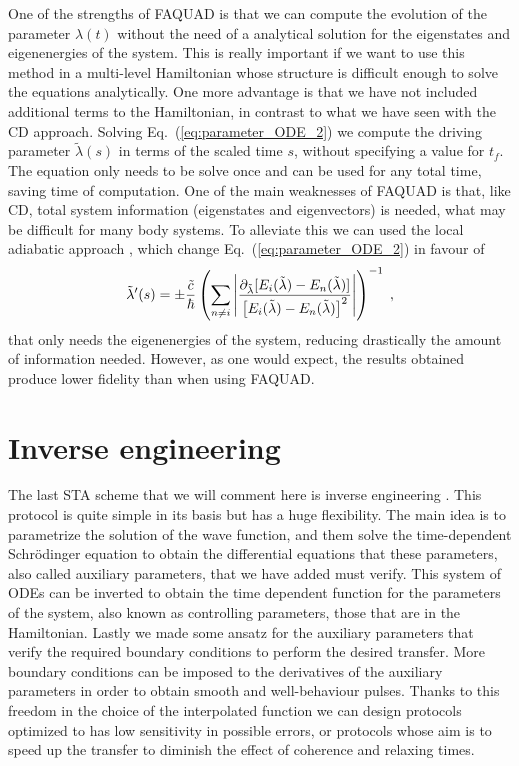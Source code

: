 One of the strengths of FAQUAD is that we can compute the evolution of the parameter $\lambda(t)$ without the need of a analytical solution for the eigenstates and eigenenergies of the system. This is really important if we want to use this method in a multi-level Hamiltonian whose structure is difficult enough to solve the equations analytically. One more advantage is that we have not included additional terms to the Hamiltonian, in contrast to what we have seen with the CD approach. Solving Eq.~(\ref{eq:parameter_ODE_2}) we compute the driving parameter $\tilde{\lambda}(s)$ in terms of the scaled time $s$, without specifying a value for $t_f$. The equation only needs to be solve once and can be used for any total time, saving time of computation. One of the main weaknesses of FAQUAD is that, like CD, total system information (eigenstates and eigenvectors) is needed, what may be difficult for many body systems. To alleviate this we can used the local adiabatic approach \cite{Roland2002}, which change Eq.~(\ref{eq:parameter_ODE_2}) in favour of
\begin{equation}
\tilde{\lambda}'(s)=\pm \frac{\tilde{c}}{\hbar}\left(\sum_{n\neq i}\abs{\frac{\partial_{\tilde{\lambda}}[E_i(\tilde{\lambda})-E_n(\tilde{\lambda})]} {\left[E_i(\tilde{\lambda})-E_n(\tilde{\lambda})\right]^2}}\right)^{-1}\; ,
\end{equation}
that only needs the eigenenergies of the system, reducing drastically the amount of information needed. However, as one would expect, the results obtained produce lower fidelity than when using FAQUAD.

\section{Inverse engineering}
The last STA scheme that we will comment here is inverse engineering \cite{Chen2012}. This protocol is quite simple in its basis but has a huge flexibility. The main idea is to parametrize the solution of the wave function, and them solve the time-dependent Schrödinger equation to obtain the differential equations that these parameters, also called auxiliary parameters, that we have added must verify. This system of ODEs can be inverted to obtain the time dependent function for the parameters of the system, also known as controlling parameters, those that are in the Hamiltonian. Lastly we made some ansatz for the auxiliary parameters that verify the required boundary conditions to perform the desired transfer. More boundary conditions can be imposed to the derivatives of the auxiliary parameters in order to obtain smooth and well-behaviour pulses. Thanks to this freedom in the choice of the interpolated function we can design protocols optimized to has low sensitivity in possible errors, or protocols whose aim is to speed up the transfer to diminish the effect of coherence and relaxing times.

